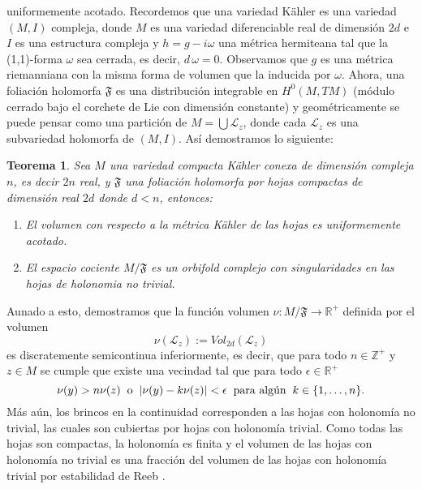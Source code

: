 \documentclass[letterpaper]{report}
\newtheorem{teorema}{Teorema}[chapter]
\newcommand{\zah}{\ensuremath{ \mathbb Z }}
\newcommand{\re}{\ensuremath{\mathbb R }}
\begin{document}
uniformemente acotado. Recordemos que una variedad K\"ahler es una variedad $(M,I)$ compleja, donde $M$ es una variedad 
diferenciable real de dimensi\'on $2d$ e $I$ es una estructura compleja y $h=g-i\omega$ una m\'etrica hermiteana tal que la (1,1)-forma $\omega$ sea cerrada,
es decir, $d\,\omega=0$. Observamos que $g$ es una m\'etrica riemanniana con la misma forma de volumen que la inducida por $\omega$. Ahora, 
una foliaci\'on holomorfa $\mathfrak{F}$ es una distribuci\'on integrable en $H^0(M,TM)$ (m\'odulo cerrado bajo el corchete de Lie con dimensi\'on constante) 
y geom\'etricamente se puede pensar como una partici\'on de $M=\bigcup\mathcal{L}_z$, donde cada $\mathcal{L}_z$ es una subvariedad 
holomorfa de $(M,I)$. As\'i demostramos lo siguiente:
\begin{teorema}\label{EMS*}
        Sea $M$ una variedad compacta K\"ahler conexa de dimensi\'on compleja $n$, es decir $2n$ real, y $\mathfrak{F}$ una foliaci\'on holomorfa por hojas
        compactas de dimensi\'on real $2d$ donde $d<n$, entonces:
        \begin{enumerate}
                \item[a)] El volumen con respecto a la m\'etrica K\"ahler de las hojas es uniformemente acotado.
                \item[b)] El espacio cociente $M/\mathfrak{F}$ es un orbifold complejo con singularidades en las hojas de holonomia no trivial.
        \end{enumerate}
\end{teorema}
Aunado a esto, demostramos que la funci\'on volumen $\nu:M/\mathfrak{F}\rightarrow\re^{+}$ definida por el volumen 
\[
        \nu(\mathcal{L}_z):=Vol_{2d}(\mathcal{L}_z)
\] 
es discratemente semicontinua inferiormente, es decir, que para todo $n\in\zah^{+}$ y $z\in M$ se cumple que existe una vecindad
tal que para todo $\epsilon\in\re^{+}$ 
\[
        \nu(y)>n\nu(z)\hspace{0.2cm}\text{o}\hspace{0.2cm}|\nu(y)-k\nu(z)|<\epsilon\hspace{0.2cm}\text{para alg\'un}\hspace{0.2cm}k\in\{1,\dots,n\}.
\]
\noindent M\'as a\'un, los brincos en la continuidad corresponden a las hojas con holonom\'ia no trivial, las cuales son cubiertas
por hojas con holonom\'ia trivial. Como todas las hojas son compactas, la holonom\'ia es finita y el volumen de las hojas
con holonom\'ia no trivial es una fracci\'on del volumen de las hojas con holonom\'ia trivial por estabilidad de Reeb \cite{Thurston}. 
\end{document}
